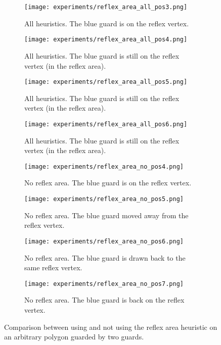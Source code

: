 \begin{figure}[h!]
    \centering
    \begin{subfigure}{0.45\textwidth}
        \texttt{[image: experiments/reflex\_area\_all\_pos3.png]}
        \caption{All heuristics. The blue guard is on the reflex vertex.}
        \label{fig:reflex_area_all1}
    \end{subfigure}
    \hfill
    \begin{subfigure}{0.45\textwidth}
        \texttt{[image: experiments/reflex\_area\_all\_pos4.png]}
        \caption{All heuristics. The blue guard is still on the reflex vertex (in the reflex area).}
    \end{subfigure}
    \hfill
    \begin{subfigure}{0.45\textwidth}
        \texttt{[image: experiments/reflex\_area\_all\_pos5.png]}
        \caption{All heuristics. The blue guard is still on the reflex vertex (in the reflex area).}
    \end{subfigure}
    \hfill
    \begin{subfigure}{0.45\textwidth}
        \texttt{[image: experiments/reflex\_area\_all\_pos6.png]}
        \caption{All heuristics. The blue guard is still on the reflex vertex (in the reflex area).}
        \label{fig:reflex_area_all4}
    \end{subfigure}
    \begin{subfigure}{0.45\textwidth}
        \texttt{[image: experiments/reflex\_area\_no\_pos4.png]}
        \caption{No reflex area. The blue guard is on the reflex vertex.}
        \label{fig:reflex_area_no1}
    \end{subfigure}
    \hfill
    \begin{subfigure}{0.45\textwidth}
        \texttt{[image: experiments/reflex\_area\_no\_pos5.png]}
        \caption{No reflex area. The blue guard moved away from the reflex vertex.}
        \label{fig:reflex_area_no2}
    \end{subfigure}
    \hfill
    \begin{subfigure}{0.45\textwidth}
        \texttt{[image: experiments/reflex\_area\_no\_pos6.png]}
        \caption{No reflex area. The blue guard is drawn back to the same reflex vertex.}
        \label{fig:reflex_area_no3}
    \end{subfigure}
    \hfill
    \begin{subfigure}{0.45\textwidth}
        \texttt{[image: experiments/reflex\_area\_no\_pos7.png]}
        \caption{No reflex area. The blue guard is back on the reflex vertex.}
        \label{fig:reflex_area_no4}
    \end{subfigure}
    \caption{Comparison between using and not using the reflex area heuristic on an arbitrary polygon guarded by two guards.}
    \label{fig:reflex_area_eg}
\end{figure}

